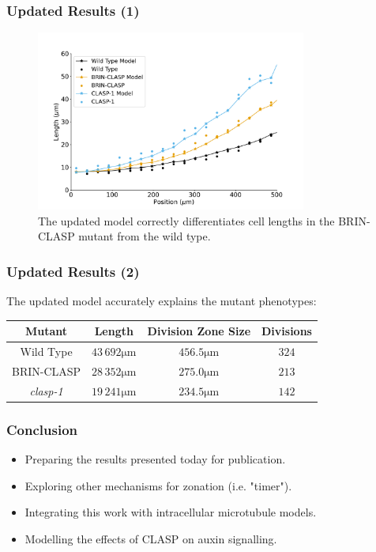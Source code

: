 \documentclass{beamer}
\newcommand{\um}{\unit{\micro\metre}}
\begin{document}
\begin{frame}
\frametitle{Updated Results (1)}
\begin{figure}
  \centering
  \includegraphics[height=16em]{column-modified-fit.pdf}
  \caption{The updated model correctly differentiates cell lengths in the BRIN-CLASP mutant from the wild type.}
\end{figure}
\end{frame}

\begin{frame}
\frametitle{Updated Results (2)}
The updated model accurately explains the mutant phenotypes:
\begin{center}
\medskip
\begin{tabular}{|c c c c |} 
 \hline
 Mutant & Length & Division Zone Size & Divisions  \\ [0.5ex] 
 \hline
 Wild Type & $43\,692\um$ &  $456.5\um$ & $324$ \\ 
 \hline
 BRIN-CLASP & $28\,352\um$ &  $275.0\um$ & $213$ \\
 \hline
 \emph{clasp-1} & $19\,241\um$ &  $234.5\um$ & $142$ \\
 \hline
\end{tabular}
\end{center}
\end{frame}

\begin{frame}
\frametitle{Conclusion}


\bigskip

\begin{itemize}
 \item<2-> Preparing the results presented today for publication.
 \item<2-> Exploring other mechanisms for zonation (i.e. "timer").
 \item<2-> Integrating this work with intracellular microtubule models.
 \item<2-> Modelling the effects of CLASP on auxin signalling.
\end{itemize}

\bigskip


\end{frame}
\end{document}
